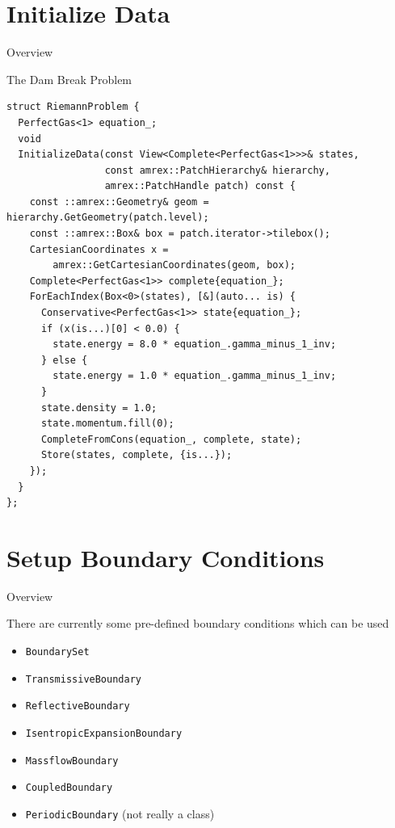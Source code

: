 \documentclass[ucs,9pt]{beamer}
\begin{document}
\section{Initialize Data}
\begin{frame}{Overview}
\tableofcontents[currentsection]
\end{frame}

\begin{frame}[fragile]{The Dam Break Problem}
\begin{lstlisting}
struct RiemannProblem {
  PerfectGas<1> equation_;
  void
  InitializeData(const View<Complete<PerfectGas<1>>>& states,
                 const amrex::PatchHierarchy& hierarchy,
                 amrex::PatchHandle patch) const {
    const ::amrex::Geometry& geom = hierarchy.GetGeometry(patch.level);
    const ::amrex::Box& box = patch.iterator->tilebox();
    CartesianCoordinates x =
        amrex::GetCartesianCoordinates(geom, box);
    Complete<PerfectGas<1>> complete{equation_};
    ForEachIndex(Box<0>(states), [&](auto... is) {
      Conservative<PerfectGas<1>> state{equation_};
      if (x(is...)[0] < 0.0) {
        state.energy = 8.0 * equation_.gamma_minus_1_inv;
      } else {
        state.energy = 1.0 * equation_.gamma_minus_1_inv;
      }
      state.density = 1.0;
      state.momentum.fill(0);
      CompleteFromCons(equation_, complete, state);
      Store(states, complete, {is...});
    });
  }
};
\end{lstlisting}
\end{frame}

\section{Setup Boundary Conditions}
\begin{frame}{Overview}
\tableofcontents[currentsection]
\end{frame}

\begin{frame}
There are currently some pre-defined boundary conditions which can be used
\vspace{0.4cm}
\begin{itemize}
	\item \texttt{BoundarySet}
	\item \texttt{TransmissiveBoundary}
	\item \texttt{ReflectiveBoundary}
	\item \texttt{IsentropicExpansionBoundary}
	\item \texttt{MassflowBoundary}
	\item \texttt{CoupledBoundary}
	\item \texttt{PeriodicBoundary} (not really a class)
\end{itemize}
\end{frame}
\end{document}
